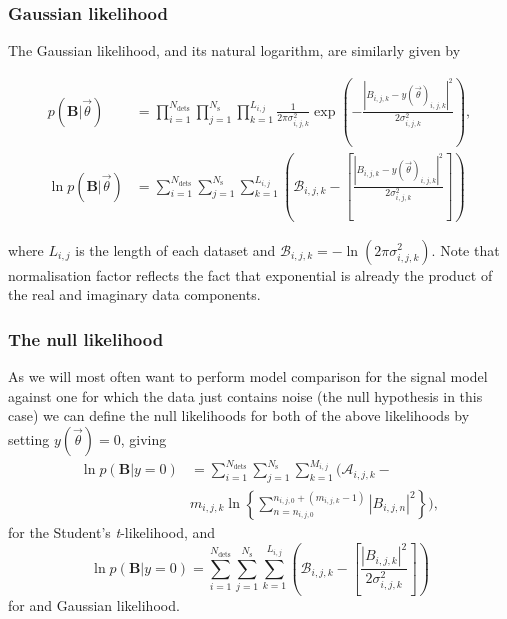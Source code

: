 \subsubsection{Gaussian likelihood}\label{sec:glikelihood}

The Gaussian likelihood, and its natural logarithm, are similarly given by
\begin{widetext}
\begin{align}\label{eq:gausslikelihood}
p(\mathbf{B}|\vec{\theta}) &= \prod_{i=1}^{N_{\text{dets}}} \prod_{j=1}^{N_{\text{s}}} \prod_{k=1}^{L_{i,j}}
\frac{1}{2\pi\sigma_{i,j,k}^2}\exp{\left(-\frac{|B_{i,j,k}-y(\vec{\theta})_{i,j,k}|^2}{2\sigma_{i,j,k}^2}
\right)}, \nonumber \\
\ln{p(\mathbf{B}|\vec{\theta})} &= \sum_{i=1}^{N_{\text{dets}}} \sum_{j=1}^{N_{\text{s}}}
\sum_{k=1}^{L_{i,j}} \left(\mathcal{B}_{i,j,k} -
\left[\frac{|B_{i,j,k}-y(\vec{\theta})_{i,j,k}|^2}{2\sigma_{i,j,k}^2 } \right] \right)
\end{align}
\end{widetext}
where $L_{i,j}$ is the length of each dataset and $\mathcal{B}_{i,j,k} = -\ln{(2\pi\sigma_{i,j,k}^2)}$. Note
that normalisation factor reflects the fact that exponential is already the product of the real and imaginary data components.

\subsubsection{The null likelihood}\label{sec:nulllike}

As we will most often want to perform model comparison for the signal model against one for which the data just contains
noise (the null hypothesis in this case) we can define the null likelihoods for both of the above likelihoods
by setting $y(\vec{\theta}) = 0$, giving
\begin{align}\label{eq:nulllike}
\ln{p(\mathbf{B}|y=0)} &= \sum_{i=1}^{N_{\text{dets}}} \sum_{j=1}^{N_{\text{s}}}
\sum_{k=1}^{M_{i,j}} \Bigg( \mathcal{A}_{i,j,k} - \nonumber \\
&m_{i,j,k}\ln{
\left\{\sum_{n=n_{i,j,0}}^{n_{i,j,0}+(m_{i,j,k}-1)} |B_{i,j,n}|^2\right\}}
\Bigg),
\end{align}
for the Student's {\it t}-likelihood, and
\begin{equation}
\ln{p(\mathbf{B}|y=0)} = \sum_{i=1}^{N_{\text{dets}}} \sum_{j=1}^{N_{\text{s}}}
\sum_{k=1}^{L_{i,j}} \left(\mathcal{B}_{i,j,k} -
\left[\frac{|B_{i,j,k}|^2}{2\sigma_{i,j,k}^2 } \right] \right)
\end{equation}
for and Gaussian likelihood.

